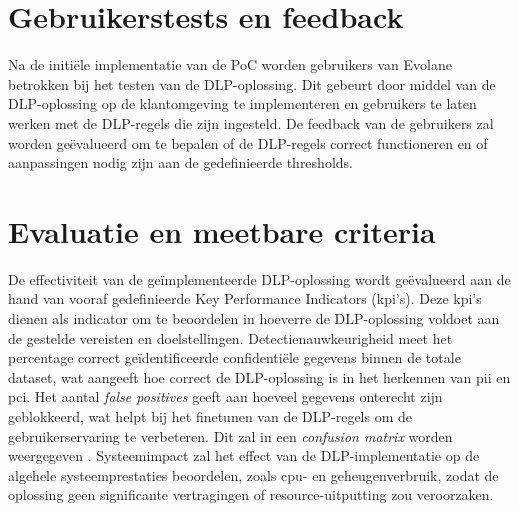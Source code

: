
\section{Gebruikerstests en feedback}%

Na de initiële implementatie van de PoC worden gebruikers van Evolane betrokken bij het testen van de DLP-oplossing. 
Dit gebeurt door middel van de DLP-oplossing op de klantomgeving te implementeren en gebruikers te laten werken met de DLP-regels die zijn ingesteld. 
De feedback van de gebruikers zal worden geëvalueerd om te bepalen of de DLP-regels correct functioneren en of aanpassingen nodig zijn aan de gedefinieerde thresholds. 

\section{Evaluatie en meetbare criteria}%

De effectiviteit van de geïmplementeerde DLP-oplossing wordt geëvalueerd aan de hand van vooraf gedefinieerde Key Performance Indicators (\gls{kpi}'s). 
Deze \gls{kpi}'s dienen als indicator om te beoordelen in hoeverre de DLP-oplossing voldoet aan de gestelde vereisten en doelstellingen.
Detectienauwkeurigheid meet het percentage correct geïdentificeerde confidentiële gegevens binnen de totale dataset, 
wat aangeeft hoe correct de DLP-oplossing is in het herkennen van \gls{pii} en \gls{pci}. 
Het aantal \textit{false positives} geeft aan hoeveel gegevens onterecht zijn geblokkeerd, 
wat helpt bij het finetunen van de DLP-regels om de gebruikerservaring te verbeteren.
Dit zal in een \textit{confusion matrix} worden weergegeven \autocite{Microsoftn.d.}.
Systeemimpact zal het effect van de DLP-implementatie op de algehele systeemprestaties beoordelen, zoals \gls{cpu}- en 
geheugenverbruik, zodat de oplossing geen significante vertragingen of resource-uitputting zou veroorzaken.

